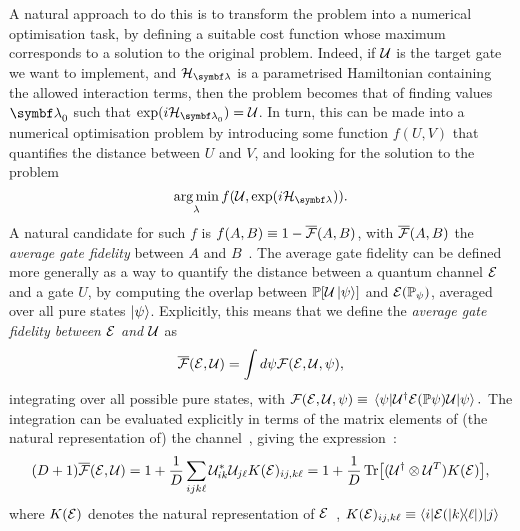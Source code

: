 A natural approach to do this is to transform the problem into a numerical optimisation task, by defining a suitable cost function whose maximum corresponds to a solution to the original problem.
Indeed, if ${\mathcal{U}}$ is the target gate we want to implement, and $\calH_\bslambda$ is a parametrised Hamiltonian containing the allowed interaction terms, then the problem becomes that of finding values $\bslambda_0$ such that $\exponential(i\calH_{\bslambda_0})=\calU$.
In turn, this can be made into a numerical optimisation problem by introducing some function $f(U, V)$ that quantifies the distance between $U$ and $V$, and looking for the solution to the problem
\begin{equation}
    \argmin_\lambda f(\calU, \exponential(i\calH_{\bslambda})).
    \label{eq:gatelearning_as_optimisation}
\end{equation}
A natural candidate for such $f$ is $f(A,B)\equiv 1-\overline{{\mathcal{F}}}(A,B)$, with $\overline{{\mathcal{F}}}(A,B)$ the \textit{average gate fidelity} between $A$ and $B$~\cite{nielsen2002simple,magesan2011gate}. The average gate fidelity can be defined more generally as a way to quantify the distance between a quantum channel ${\mathcal{E}}$ and a gate $U$, by computing the overlap between $\mathbb{P}[{\mathcal{U}}\ket\psi]$ and ${\mathcal{E}}(\mathbb{P}_\psi)$, averaged over all pure states $\ket\psi$. Explicitly, this means that we define the \emph{average gate fidelity between ${\mathcal{E}}$ and ${\mathcal{U}}$} as
\begin{equation}
    \overline{{\mathcal{F}}}({\mathcal{E}},{\mathcal{U}}) = \int d\psi {\mathcal{F}}({\mathcal{E}}, {\mathcal{U}}, \psi),
\end{equation}
integrating over all possible pure states, with
$
    {\mathcal{F}}({\mathcal{E}}, {\mathcal{U}}, \psi) \equiv
    \mel*{\psi}{{\mathcal{U}}^\dagger {\mathcal{E}}(\mathbb{P}\psi){\mathcal{U}}}{\psi}.
$%
The integration can be evaluated explicitly in terms of the matrix elements of (the natural representation of) the channel~\cite{banchi2011nonperturbative,magesan2011gate,pedersen2007fidelity}, giving the expression~\cite{banchi2016quantum}:
\begin{equation}
    (D+1) \overline{{\mathcal{F}}}({\mathcal{E}},{\mathcal{U}}) =
    1 + \frac{1}{D}\sum_{ijk\ell}{\mathcal{U}}^*_{ik} {\mathcal{U}}_{j\ell}K({\mathcal{E}})_{ij,k\ell}
    = 1 + \frac{1}{D}\Tr[({\mathcal{U}}^\dagger\otimes {\mathcal{U}}^T)K({\mathcal{E}})],
    \label{eq:explicit_fidelity_map_unitary}
\end{equation}
where $K({\mathcal{E}})$ denotes the natural representation of ${\mathcal{E}}$~\cite{watrous2018theory},
$K({\mathcal{E}})_{ij,k\ell}\equiv\langle i|{\mathcal{E}}(\ketbra{k}{\ell})|j\rangle$
